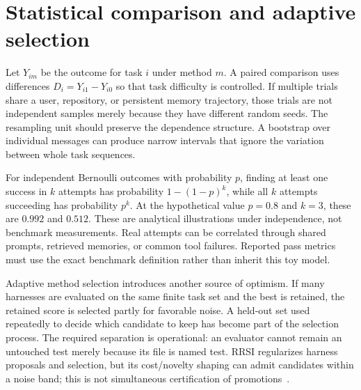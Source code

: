 \section{Statistical comparison and adaptive selection}\label{sec:C02:06}
Let $Y_{im}$ be the outcome for task $i$ under method $m$. A paired comparison uses differences $D_i=Y_{i1}-Y_{i0}$ so that task difficulty is controlled. If multiple trials share a user, repository, or persistent memory trajectory, those trials are not independent samples merely because they have different random seeds. The resampling unit should preserve the dependence structure. A bootstrap over individual messages can produce narrow intervals that ignore the variation between whole task sequences.

For independent Bernoulli outcomes with probability $p$, finding at least one success in $k$ attempts has probability $1-(1-p)^k$, while all $k$ attempts succeeding has probability $p^k$. At the hypothetical value $p=0.8$ and $k=3$, these are $0.992$ and $0.512$. These are analytical illustrations under independence, not benchmark measurements. Real attempts can be correlated through shared prompts, retrieved memories, or common tool failures. Reported pass metrics must use the exact benchmark definition rather than inherit this toy model.

Adaptive method selection introduces another source of optimism. If many harnesses are evaluated on the same finite task set and the best is retained, the retained score is selected partly for favorable noise. A held-out set used repeatedly to decide which candidate to keep has become part of the selection process. The required separation is operational: an evaluator cannot remain an untouched test merely because its file is named test. RRSI regularizes harness proposals and selection, but its cost/novelty shaping can admit candidates within a noise band; this is not simultaneous certification of promotions~\cite{rrsi2026,ch02_rrsi_code2026}.

